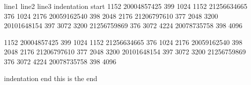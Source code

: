 line1
line2
line3
indentation start
         1152	20004857425	 399	       1024
         1152	21256634665	 376	       1024
         2176	20059162540	 398	       2048
         2176	21206797610	 377	       2048
         3200	20101648154	 397	       3072
         3200	21256759869	 376	       3072
         4224	20078735758	 398	       4096

         1152	20004857425	 399	       1024
         1152	21256634665	 376	       1024
         2176	20059162540	 398	       2048
         2176	21206797610	 377	       2048
         3200	20101648154	 397	       3072
         3200	21256759869	 376	       3072
         4224	20078735758	 398	       4096

indentation end
this is the end